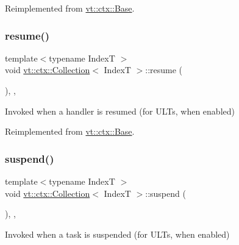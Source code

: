 Reimplemented from \hyperlink{structvt_1_1ctx_1_1_base_a113bac732b2831caa8eed11609ccaf0e}{vt\+::ctx\+::\+Base}.

\mbox{\label{structvt_1_1ctx_1_1_collection_a4cf87cf7d38bd8d4706ffda41e31c9c6}} 
\subsubsection{\texorpdfstring{resume()}{resume()}}
{\footnotesize\ttfamily template$<$typename IndexT $>$ \\
void \hyperlink{structvt_1_1ctx_1_1_collection}{vt\+::ctx\+::\+Collection}$<$ IndexT $>$\+::resume (\begin{DoxyParamCaption}{ }\end{DoxyParamCaption})\hspace{0.3cm}{\ttfamily [final]}, {\ttfamily [override]}, {\ttfamily [virtual]}}



Invoked when a handler is resumed (for U\+L\+Ts, when enabled) 



Reimplemented from \hyperlink{structvt_1_1ctx_1_1_base_a303afabb40ed83057fbe30c744db95da}{vt\+::ctx\+::\+Base}.

\mbox{\label{structvt_1_1ctx_1_1_collection_a8355e824435241b61bb9774b4546c0de}} 
\subsubsection{\texorpdfstring{suspend()}{suspend()}}
{\footnotesize\ttfamily template$<$typename IndexT $>$ \\
void \hyperlink{structvt_1_1ctx_1_1_collection}{vt\+::ctx\+::\+Collection}$<$ IndexT $>$\+::suspend (\begin{DoxyParamCaption}{ }\end{DoxyParamCaption})\hspace{0.3cm}{\ttfamily [final]}, {\ttfamily [override]}, {\ttfamily [virtual]}}



Invoked when a task is suspended (for U\+L\+Ts, when enabled) 



